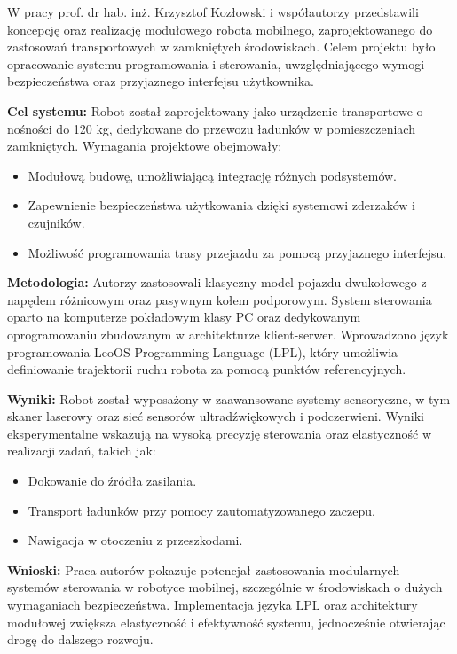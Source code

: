 \documentclass[a4paper,twoside,12pt]{book}
\begin{document}
W pracy \cite{bib:mikekus2014system} prof. dr hab. inż. Krzysztof Kozłowski i współautorzy przedstawili koncepcję oraz realizację modułowego robota mobilnego, zaprojektowanego do zastosowań transportowych w zamkniętych środowiskach. Celem projektu było opracowanie systemu programowania i sterowania, uwzględniającego wymogi bezpieczeństwa oraz przyjaznego interfejsu użytkownika.

\textbf{Cel systemu:}
Robot został zaprojektowany jako urządzenie transportowe o nośności do 120 kg, dedykowane do przewozu ładunków w pomieszczeniach zamkniętych. Wymagania projektowe obejmowały:
\begin{itemize}
    \item Modułową budowę, umożliwiającą integrację różnych podsystemów.
    \item Zapewnienie bezpieczeństwa użytkowania dzięki systemowi zderzaków i czujników.
    \item Możliwość programowania trasy przejazdu za pomocą przyjaznego interfejsu.
\end{itemize}

\textbf{Metodologia:}
Autorzy zastosowali klasyczny model pojazdu dwukołowego z napędem różnicowym oraz pasywnym kołem podporowym. System sterowania oparto na komputerze pokładowym klasy PC oraz dedykowanym oprogramowaniu zbudowanym w architekturze klient-serwer. Wprowadzono język programowania LeoOS Programming Language (LPL), który umożliwia definiowanie trajektorii ruchu robota za pomocą punktów referencyjnych.

\textbf{Wyniki:}
Robot został wyposażony w zaawansowane systemy sensoryczne, w tym skaner laserowy oraz sieć sensorów ultradźwiękowych i podczerwieni. Wyniki eksperymentalne wskazują na wysoką precyzję sterowania oraz elastyczność w realizacji zadań, takich jak:
\begin{itemize}
    \item Dokowanie do źródła zasilania.
    \item Transport ładunków przy pomocy zautomatyzowanego zaczepu.
    \item Nawigacja w otoczeniu z przeszkodami.
\end{itemize}

\textbf{Wnioski:}
Praca autorów pokazuje potencjał zastosowania modularnych systemów sterowania w robotyce mobilnej, szczególnie w środowiskach o dużych wymaganiach bezpieczeństwa. Implementacja języka LPL oraz architektury modułowej zwiększa elastyczność i efektywność systemu, jednocześnie otwierając drogę do dalszego rozwoju.
\end{document}
